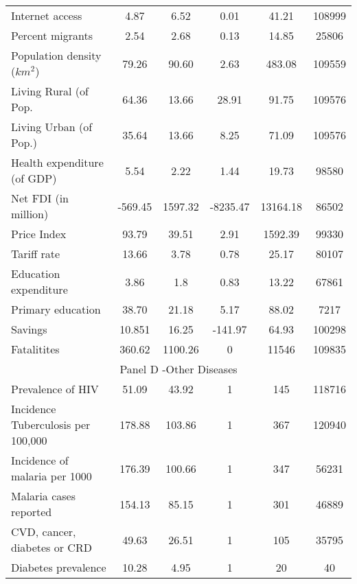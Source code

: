 \documentclass{article}
\begin{document}
\begin{center}
\begin{table}[htbp]
{\begin{tabular}{l c c c c c}
Internet access & 4.87 & 6.52 & 0.01 & 41.21 & 108999\\
Percent migrants & 2.54 & 2.68 & 0.13 & 14.85 & 25806\\
Population density ($km^2$) & 79.26 & 90.60 & 2.63 & 483.08 & 109559\\
Living Rural (of Pop. & 64.36 & 13.66 & 28.91 & 91.75 & 109576\\
Living Urban (of Pop.) & 35.64 & 13.66 & 8.25 & 71.09 & 109576\\
Health expenditure (of GDP) & 5.54 & 2.22 & 1.44 & 19.73 & 98580\\
Net FDI (in million) & -569.45 & 1597.32 & -8235.47 & 13164.18 & 86502\\
Price Index & 93.79 & 39.51 & 2.91 & 1592.39 & 99330\\
Tariff rate & 13.66 & 3.78 & 0.78 & 25.17 & 80107\\
Education expenditure & 3.86 & 1.8 & 0.83 & 13.22 & 67861\\
Primary education & 38.70 & 21.18 & 5.17 & 88.02 & 7217\\
Savings & 10.851 & 16.25 & -141.97 & 64.93 & 100298\\
Fatalitites & 360.62 & 1100.26 & 0 & 11546 & 109835 \\
\hline \hline
\multicolumn{6}{c}{Panel D -Other Diseases}\\ \hline

Prevalence of HIV & 51.09 & 43.92 & 1 & 145 & 118716\\
Incidence Tuberculosis per 100,000 & 178.88 & 103.86 & 1 & 367 & 120940\\
Incidence of malaria per 1000 & 176.39 & 100.66 & 1 & 347 & 56231\\
Malaria cases reported & 154.13 & 85.15 & 1 & 301 & 46889\\
CVD, cancer, diabetes or CRD & 49.63 & 26.51 & 1 & 105 & 35795\\
Diabetes prevalence & 10.28 & 4.95 & 1 & 20 & 40\\

\hline
\end{tabular}
}
\end{table}
\end{center}
\end{document}
